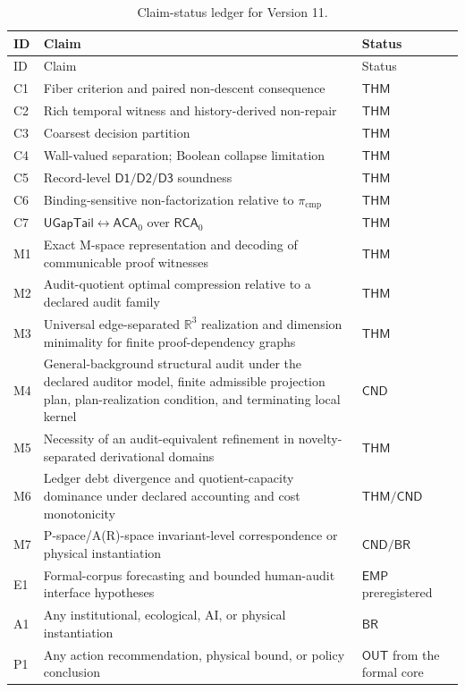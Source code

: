 \documentclass[11pt]{article}
\newcommand{\DOne}{\ensuremath{\mathsf{D1}}}
\newcommand{\DTwo}{\ensuremath{\mathsf{D2}}}
\newcommand{\DThree}{\ensuremath{\mathsf{D3}}}
\newcommand{\RCA}{\ensuremath{\mathsf{RCA}_0}}
\newcommand{\ACA}{\ensuremath{\mathsf{ACA}_0}}
\newcommand{\UGapTail}{\ensuremath{\mathsf{UGapTail}}}
\theoremstyle{plain}
\theoremstyle{definition}
\theoremstyle{remark}
\begin{document}
\begin{longtable}{p{}p{}p{}}
\caption{Claim-status ledger for Version 11.}\label{tab:claim-status}\\
\toprule
ID & Claim & Status \\
\midrule
\endfirsthead
\toprule
ID & Claim & Status \\
\midrule
\endhead
C1 & Fiber criterion and paired non-descent consequence & $\mathsf{THM}$ \\
C2 & Rich temporal witness and history-derived non-repair & $\mathsf{THM}$ \\
C3 & Coarsest decision partition & $\mathsf{THM}$ \\
C4 & Wall-valued separation; Boolean collapse limitation & $\mathsf{THM}$ \\
C5 & Record-level $\DOne/\DTwo/\DThree$ soundness & $\mathsf{THM}$ \\
C6 & Binding-sensitive non-factorization relative to $\pi_{\mathrm{cmp}}$ & $\mathsf{THM}$ \\
C7 & $\UGapTail\leftrightarrow\ACA$ over $\RCA$ & $\mathsf{THM}$ \\
M1 & Exact M-space representation and decoding of communicable proof witnesses & $\mathsf{THM}$ \\
M2 & Audit-quotient optimal compression relative to a declared audit family & $\mathsf{THM}$ \\
M3 & Universal edge-separated $\mathbb R^3$ realization and dimension minimality for finite proof-dependency graphs & $\mathsf{THM}$ \\
M4 & General-background structural audit under the declared auditor model, finite admissible projection plan, plan-realization condition, and terminating local kernel & $\mathsf{CND}$ \\
M5 & Necessity of an audit-equivalent refinement in novelty-separated derivational domains & $\mathsf{THM}$ \\
M6 & Ledger debt divergence and quotient-capacity dominance under declared accounting and cost monotonicity & $\mathsf{THM}/\mathsf{CND}$ \\
M7 & P-space/A(R)-space invariant-level correspondence or physical instantiation & $\mathsf{CND}/\mathsf{BR}$ \\
E1 & Formal-corpus forecasting and bounded human-audit interface hypotheses & $\mathsf{EMP}$ preregistered \\
A1 & Any institutional, ecological, AI, or physical instantiation & $\mathsf{BR}$ \\
P1 & Any action recommendation, physical bound, or policy conclusion & $\mathsf{OUT}$ from the formal core \\
\bottomrule
\end{longtable}
\end{document}
